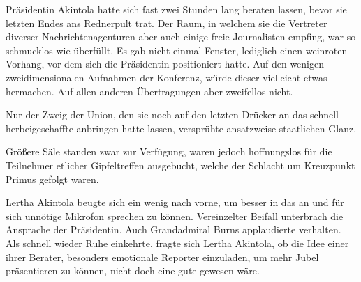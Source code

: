 Präsidentin Akintola hatte sich fast zwei Stunden lang beraten lassen, bevor sie letzten Endes ans Rednerpult trat. Der Raum, in welchem sie die Vertreter diverser Nachrichtenagenturen aber auch einige freie Journalisten empfing, war so schmucklos wie überfüllt. Es gab nicht einmal Fenster, lediglich einen weinroten Vorhang, vor dem sich die Präsidentin positioniert hatte. Auf den wenigen zweidimensionalen Aufnahmen der Konferenz, würde dieser vielleicht etwas hermachen. Auf allen anderen Übertragungen aber zweifellos nicht.

\par

Nur der Zweig der Union, den sie noch auf den letzten Drücker an das schnell herbeigeschaffte  anbringen hatte lassen, versprühte ansatzweise staatlichen Glanz.

\par

Größere Säle standen zwar zur Verfügung, waren jedoch hoffnungslos für die Teilnehmer etlicher Gipfeltreffen ausgebucht, welche der Schlacht um Kreuzpunkt Primus gefolgt waren.

\par

Lertha Akintola beugte sich ein wenig nach vorne, um besser in das an und für sich unnötige Mikrofon sprechen zu können.  Vereinzelter Beifall unterbrach die Ansprache der Präsidentin. Auch Grandadmiral Burns applaudierte verhalten. Als schnell wieder Ruhe einkehrte, fragte sich Lertha Akintola, ob die Idee einer ihrer Berater, besonders emotionale Reporter einzuladen, um mehr Jubel präsentieren zu können, nicht doch eine gute gewesen wäre.

\par

